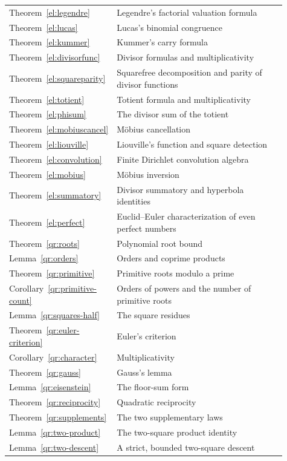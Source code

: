 \begin{longtable}{p{0.16\linewidth}p{0.75\linewidth}}
Theorem~\ref{el:legendre} & Legendre's factorial valuation formula\\
Theorem~\ref{el:lucas} & Lucas's binomial congruence\\
Theorem~\ref{el:kummer} & Kummer's carry formula\\
Theorem~\ref{el:divisorfunc} & Divisor formulas and multiplicativity\\
Theorem~\ref{el:squareparity} & Squarefree decomposition and parity of divisor functions\\
Theorem~\ref{el:totient} & Totient formula and multiplicativity\\
Theorem~\ref{el:phisum} & The divisor sum of the totient\\
Theorem~\ref{el:mobiuscancel} & M\"obius cancellation\\
Theorem~\ref{el:liouville} & Liouville's function and square detection\\
Theorem~\ref{el:convolution} & Finite Dirichlet convolution algebra\\
Theorem~\ref{el:mobius} & M\"obius inversion\\
Theorem~\ref{el:summatory} & Divisor summatory and hyperbola identities\\
Theorem~\ref{el:perfect} & Euclid--Euler characterization of even perfect numbers\\
Theorem~\ref{qr:roots} & Polynomial root bound\\
Lemma~\ref{qr:orders} & Orders and coprime products\\
Theorem~\ref{qr:primitive} & Primitive roots modulo a prime\\
Corollary~\ref{qr:primitive-count} & Orders of powers and the number of primitive roots\\
Lemma~\ref{qr:squares-half} & The square residues\\
Theorem~\ref{qr:euler-criterion} & Euler's criterion\\
Corollary~\ref{qr:character} & Multiplicativity\\
Theorem~\ref{qr:gauss} & Gauss's lemma\\
Lemma~\ref{qr:eisenstein} & The floor-sum form\\
Theorem~\ref{qr:reciprocity} & Quadratic reciprocity\\
Theorem~\ref{qr:supplements} & The two supplementary laws\\
Lemma~\ref{qr:two-product} & The two-square product identity\\
Lemma~\ref{qr:two-descent} & A strict, bounded two-square descent\\

\end{longtable}
